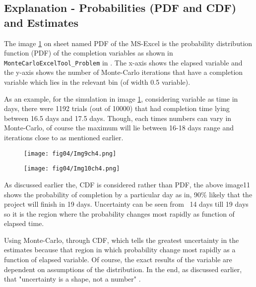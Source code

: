 \subsection{Explanation - Probabilities (PDF and CDF) and Estimates}

The image \ref{img9ch4} on sheet named PDF of the MS-Excel is the probability distribution function (PDF) of the completion variables as shown in \texttt{MonteCarloExcelTool\_Problem} in \cite{Github}. The x-axis shows the elapsed variable and the y-axis shows the number of Monte-Carlo iterations that have a completion variable which lies in the relevant bin (of width 0.5 variable).


As an example, for the simulation in image \ref{img9ch4}, considering variable as time in days, there were 1192 trials (out of 10000) that had completion time lying between 16.5 days and 17.5 days. Though, each times numbers can vary in Monte-Carlo, of course the maximum will lie between 16-18 days range and iterations close to as mentioned earlier.

\begin{figure}
	\centering
	\texttt{[image: fig04/Img9ch4.png]}
	\label{img9ch4}
\end{figure}

\begin{figure}
	\centering
	\texttt{[image: fig04/Img10ch4.png]}
	\label{img10ch4}
\end{figure}


As discussed earlier the, CDF is considered rather than PDF, the above image11 shows the probability of completion by a particular day as in, 90\% likely that the project will finish in 19 days. Uncertainty can be seen from ~14 days till 19 days so it is the region where the probability changes most rapidly as function of elapsed time.

Using Monte-Carlo, through CDF, which tells the greatest uncertainty in the estimates because that region in which probability change most rapidly as a function of elapsed variable. Of course, the exact results of the variable are dependent on assumptions of the distribution. In the end, as discussed earlier, that "uncertainty is a shape, not a number" \cite{Uncertainty}. 